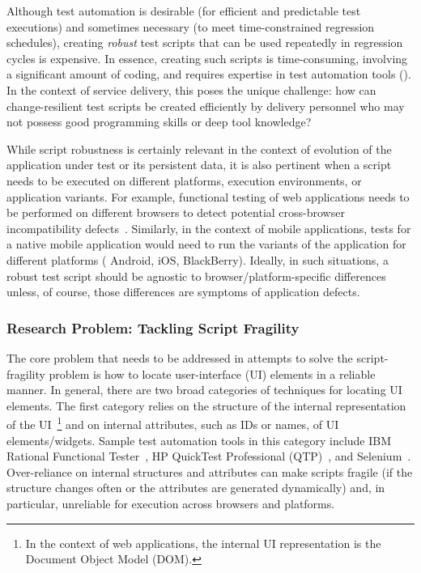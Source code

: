 Although test automation is desirable (\eg for efficient and predictable test
executions) and sometimes necessary (\eg to meet time-constrained regression
schedules), creating \textit{robust} test scripts that can be used repeatedly in
regression cycles is expensive. In essence, creating such scripts is
time-consuming, involving a significant amount of coding, and requires expertise
in test automation tools (\eg \cite{hpqtp,ibmrft,selenium}). In the context of
service delivery, this poses the unique challenge: how can change-resilient test
scripts be created efficiently by delivery personnel who may not possess good
programming skills or deep tool knowledge?


While script robustness is certainly relevant in the context of evolution of the
application under test or its persistent data, it is also pertinent when a
script needs to be executed on different platforms, execution environments, or
application variants. For example, functional testing of web applications needs
to be performed on different browsers to detect potential cross-browser
incompatibility
defects~\cite{Choudhary2010,Shauvik:2012,Choudhary:2013,Mesbah:2011}. Similarly,
in the context of mobile applications, tests for a native mobile application
would need to run the variants of the application for different platforms (\eg
Android, iOS, BlackBerry). Ideally, in such situations, a robust test script
should be agnostic to browser/platform-specific differences unless, of course,
those differences are symptoms of application defects.

\subsubsection*{Research Problem: Tackling Script Fragility}

The core problem that needs to be addressed in attempts to solve the
script-fragility problem is how to locate user-interface (UI) elements in a
reliable manner. In general, there are two broad categories of techniques for
locating UI elements. The first category relies on the structure of the internal
representation of the UI~\footnote{\small In the context of web applications,
  the internal UI representation is the Document Object Model (DOM).} and on
internal attributes, such as IDs or names, of UI elements/widgets. Sample test
automation tools in this category include IBM Rational Functional
Tester~\cite{ibmrft}, HP QuickTest Professional (QTP)~\cite{hpqtp}, and
Selenium~\cite{selenium}. Over-reliance on internal structures and attributes
can make scripts fragile (\eg if the structure changes often or the attributes
are generated dynamically) and, in particular, unreliable for execution across
browsers and platforms.

